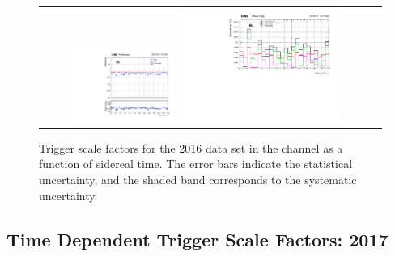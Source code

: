 {\begin{figure}[h]
  \begin{center}
    \begin{tabular}{cc}
      \includegraphics[width=0.32\textwidth]{fig_2016_sidereal/g_emu_sidereel_FullSystUncBand.pdf}
      \includegraphics[width=0.50\textwidth]{fig_2016_sidereal/g_emu_sidereel_ErrorsBreakdown.pdf}\\
    \end{tabular}
    \caption{Trigger scale factors for the 2016 data set in the \emu channel as a function of sidereal time.
            The error bars indicate the statistical uncertainty, and the shaded band corresponds to the systematic uncertainty.
            }
    \label{TrigSF_SideReal_2016_1}
  \end{center}
\end{figure}

\newpage
\subsection{Time Dependent Trigger Scale Factors: 2017}
\label{TrigSFResults_SideReal_2017}

}
